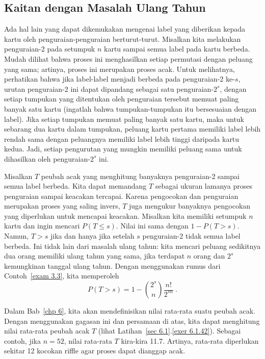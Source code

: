 \subsection*{Kaitan dengan Masalah Ulang Tahun} 
Ada hal lain yang dapat dikemukakan mengenai label yang diberikan kepada kartu oleh
penguraian-penguraian berturut-turut.  Misalkan kita melakukan penguraian-2 pada setumpuk $n$ kartu
sampai semua label pada kartu berbeda.  Mudah dilihat bahwa proses ini menghasilkan
setiap permutasi dengan peluang yang sama; artinya, proses ini merupakan proses acak.
Untuk melihatnya, perhatikan bahwa jika label-label menjadi berbeda pada penguraian-2
ke-$s$, urutan penguraian-2 ini dapat dipandang sebagai satu penguraian-$2^s$, dengan
setiap tumpukan yang ditentukan oleh penguraian tersebut memuat paling banyak satu kartu
(ingatlah bahwa tumpukan-tumpukan itu bersesuaian dengan label).  Jika setiap tumpukan
memuat paling banyak satu kartu, maka untuk sebarang dua kartu dalam tumpukan, peluang
kartu pertama memiliki label lebih rendah sama dengan peluangnya memiliki label lebih
tinggi daripada kartu kedua.  Jadi, setiap pengurutan yang mungkin memiliki peluang sama
untuk dihasilkan oleh penguraian-$2^s$ ini.
\par
Misalkan $T$ peubah acak yang menghitung banyaknya penguraian-2 sampai semua label berbeda.
Kita dapat memandang $T$ sebagai ukuran lamanya proses penguraian sampai keacakan tercapai.
Karena pengocokan dan penguraian merupakan proses yang saling invers, $T$ juga mengukur
banyaknya pengocokan yang diperlukan untuk mencapai keacakan.  Misalkan kita memiliki
setumpuk $n$ kartu dan ingin mencari $P(T \le s)$.  Nilai ini sama dengan $1 - P(T > s)$.
Namun, $T > s$ jika dan hanya jika setelah $s$ penguraian-2 tidak semua label berbeda.
Ini tidak lain dari masalah ulang tahun: kita mencari peluang sedikitnya dua orang
memiliki ulang tahun yang sama, jika terdapat $n$ orang dan $2^s$ kemungkinan tanggal
ulang tahun.  Dengan menggunakan rumus dari Contoh~\ref{exam 3.3}, kita memperoleh
\begin{equation}
P(T > s) = 1 - {{2^s} \choose n} \frac {n!}{2^{sn}}\ .
\label{eq 3.3.1}
\end{equation}
\par
Dalam Bab~\ref{chp 6}, kita akan mendefinisikan nilai rata-rata suatu peubah acak.  Dengan
menggunakan gagasan ini dan persamaan di atas, kita dapat menghitung nilai rata-rata
peubah acak $T$ (lihat Latihan~\ref{sec 6.1}.\ref{exer 6.1.42}).  Sebagai contoh, jika
$n = 52$, nilai rata-rata $T$ kira-kira 11.7.  Artinya, rata-rata diperlukan sekitar 12
kocokan riffle agar proses dapat dianggap acak.



